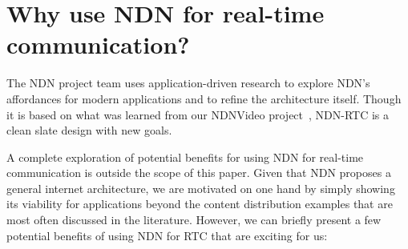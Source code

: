 \documentclass{icn/sig-alternate-2013} %
\newcommand{\ndnrtcName}{NDN-RTC} %
\begin{document}
\section{Why use NDN for real-time communication?}
\label{sec:why}

The NDN project team uses application-driven research to explore NDN's affordances for modern applications and to refine the architecture itself.  Though it is based on what was learned from our NDNVideo project~\cite{ndnvideo}, \ndnrtcName{} is a clean slate design with new goals.  

A complete exploration of potential benefits for using NDN for real-time communication is outside the scope of this paper. Given that NDN proposes a general internet architecture, we are motivated on one hand by simply showing its viability for applications beyond the content distribution examples that are most often discussed in the literature.  However, we can briefly present a few potential benefits of using NDN for RTC that are exciting for us: 
\end{document}
